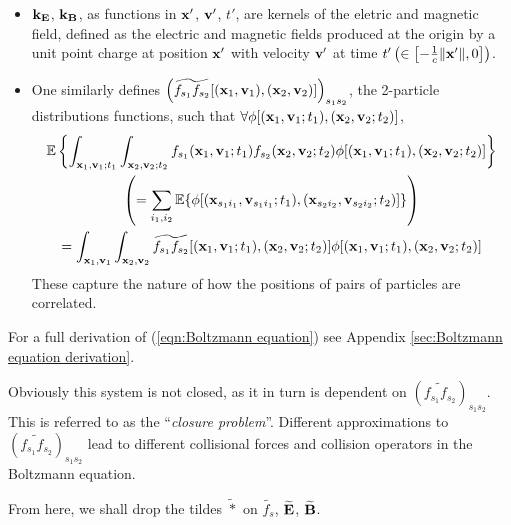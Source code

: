    \begin{itemize}
        \item  $\mathbf{k}_{\mathbf{E}}$, $\mathbf{k}_{\mathbf{B}}$, as functions in $\mathbf{x}'$, $\mathbf{v}'$, $t'$, are kernels of the eletric and magnetic field, defined as the electric and magnetic fields produced at the origin by a unit point charge at position $\mathbf{x}'$ with velocity $\mathbf{v}'$ at time $t' \left(\in \left[-\frac{1}{c}\|\mathbf{x}'\|, 0\right]\right)$.
        
        \item  One similarly defines $\left(\widetilde{f_{s_{1}}f_{s_{2}}}[(\mathbf{x}_{1}, \mathbf{v}_{1}), (\mathbf{x}_{2}, \mathbf{v}_{2})]\right)_{s_{1}s_{2}}$, the 2-particle distributions functions, such that $\forall \phi[(\mathbf{x}_{1}, \mathbf{v}_{1}; t_{1}), (\mathbf{x}_{2}, \mathbf{v}_{2}; t_{2})]$,
        \begin{multline}
            \mathbb{E}\left\{\int_{\mathbf{x}_{1}, \mathbf{v}_{1}; t_{1}}\int_{\mathbf{x}_{2}, \mathbf{v}_{2}; t_{2}}f_{s_{1}}(\mathbf{x}_{1}, \mathbf{v}_{1}; t_{1})f_{s_{2}}(\mathbf{x}_{2}, \mathbf{v}_{2}; t_{2})\phi[(\mathbf{x}_{1}, \mathbf{v}_{1}; t_{1}), (\mathbf{x}_{2}, \mathbf{v}_{2}; t_{2})]\right\}  \\
            \left(=  \sum_{i_{1}, i_{2}}\mathbb{E}\{\phi[(\mathbf{x}_{s_{1}i_{1}}, \mathbf{v}_{s_{1}i_{1}}; t_{1}), (\mathbf{x}_{s_{2}i_{2}}, \mathbf{v}_{s_{2}i_{2}}; t_{2})]\}\right)  \\
            =  \int_{\mathbf{x}_{1}, \mathbf{v}_{1}}\int_{\mathbf{x}_{2}, \mathbf{v}_{2}}\widetilde{f_{s_{1}}f_{s_{2}}}[(\mathbf{x}_{1}, \mathbf{v}_{1}; t_{1}), (\mathbf{x}_{2}, \mathbf{v}_{2}; t_{2})]\phi[(\mathbf{x}_{1}, \mathbf{v}_{1}; t_{1}), (\mathbf{x}_{2}, \mathbf{v}_{2}; t_{2})]
        \end{multline}
        These capture the nature of how the positions of pairs of particles are correlated.
    \end{itemize}
    For a full derivation of (\ref{eqn:Boltzmann equation}) see Appendix \ref{sec:Boltzmann equation derivation}.

    Obviously this system is not closed, as it in turn is dependent on $\left(\widetilde{f_{s_{1}}f_{s_{2}}}\right)_{s_{1}s_{2}}$. This is referred to as the ``\emph{closure problem}''. Different approximations to $\left(\widetilde{f_{s_{1}}f_{s_{2}}}\right)_{s_{1}s_{2}}$ lead to different collisional forces and collision operators in the Boltzmann equation.

    From here, we shall drop the tildes $\widetilde{*}$ on $\widetilde{f_{s}}$, $\widetilde{\mathbf{E}}$, $\widetilde{\mathbf{B}}$.
    